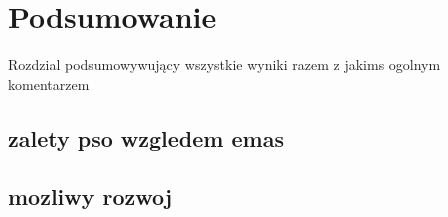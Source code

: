 \chapter{Podsumowanie}
\label{cha:podsumowanie}

Rozdzial podsumowywujący wszystkie wyniki razem  z jakims ogolnym komentarzem

\section{zalety pso wzgledem emas}
\section{mozliwy rozwoj}




